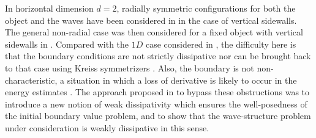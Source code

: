 \documentclass[11pt]{article}
\theoremstyle{definition}
\begin{document}
In horizontal dimension $d=2$, radially symmetric configurations for both the object and the waves have been considered in \cite{Bocchi1,Bocchi2}
in the case of vertical sidewalls.
The general non-radial case was then considered for a fixed object with vertical sidewalls in \cite{IguchiLannes2023}.
Compared with the $1D$ case considered in \cite{IguchiLannes2021}, the difficulty here is that
the boundary conditions are not strictly dissipative nor can be brought back to that case using Kreiss symmetrizers \cite{Majda,Metivier,BenzoniSerre,Audiard}.
Also, the boundary is not non-characteristic,
a situation in which a loss of derivative is likely to occur in the energy estimates \cite{Gues,Secchi,MajdaOsher,CoulombelSecchi}.
The approach proposed in \cite{IguchiLannes2023} to bypass these obstructions was to introduce a new notion of weak dissipativity
which ensures the well-posedness of the initial boundary value problem,
and to show that the wave-structure problem under consideration is weakly dissipative in this sense.
\end{document}
